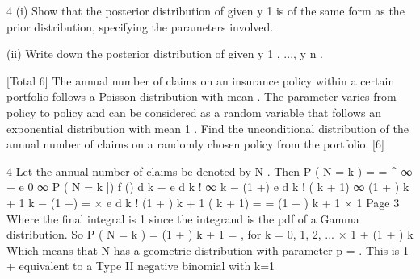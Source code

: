\documentclass[a4paper,12pt]{article}
\begin{document}
4
(i) Show that the posterior distribution of \theta  given y 1 is of the same form as the
prior distribution, specifying the parameters involved.

(ii) Write down the posterior distribution of \theta  given y 1 , ..., y n .

[Total 6]
The annual number of claims on an insurance policy within a certain portfolio follows
a Poisson distribution with mean \mu . The parameter \mu  varies from policy to policy and
can be considered as a random variable that follows an exponential distribution with
mean 1 .
\lambda 
Find the unconditional distribution of the annual number of claims on a randomly
chosen policy from the portfolio.
[6]



4
Let the annual number of claims be denoted by N . Then
P ( N = k ) =
=
\int^{\infty} 
∞ −\mu 
e
0
∞
P ( N = k |\mu ) f (\mu ) d \mu 
\mu  k −\lambda \mu 
\lambda  e d \mu 
k !
\lambda  ∞ k − (1 +\lambda  ) \mu 
\mu  e
d \mu 
k ! 
\lambda  \Gamma  ( k + 1) ∞ (1 + \lambda  ) k + 1 k − (1 +\lambda  ) \mu 
= ×
\mu  e
d \mu 
k ! (1 + \lambda  ) k + 1  \Gamma  ( k + 1)
=
=
\lambda 
(1 + \lambda  ) k + 1
× 1
Page 3%
Where the final integral is 1 since the integrand is the pdf of a Gamma distribution.
So
P ( N = k ) =
\lambda 
(1 + \lambda  )
k + 1
=
, for k = 0, 1, 2, ...
×
1 + \lambda  (1 + \lambda  ) k
Which means that N has a geometric distribution with parameter p =
\lambda 
. This is
1 + \lambda 
equivalent to a Type II negative binomial with k=1


\end{document}
